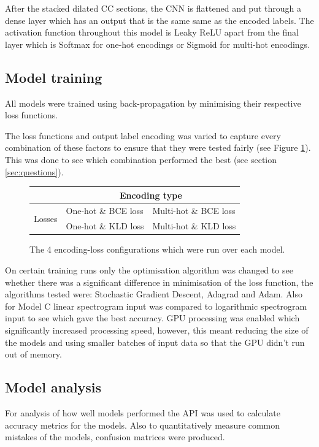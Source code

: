 \documentclass[12pt]{article}
\begin{document}
    After the stacked dilated CC sections, the CNN is flattened and put through a dense layer which has an output that is the same same as the encoded labels. The activation function throughout this model is Leaky ReLU apart from the final layer which is Softmax for one-hot encodings or Sigmoid for multi-hot encodings.\medskip
    
    \subsection{Model training}
    All models were trained using back-propagation by minimising their respective loss functions.\medskip
    
    The loss functions and output label encoding was varied to capture every combination of these factors to ensure that they were tested fairly (see Figure \ref{fig:test_table}). This was done to see which combination performed the best (see section \ref{sec:questions}).\medskip
    
    \begin{figure}[H]
        \centering
        \begin{tabular}{l|l|l|}
            & \multicolumn{2}{c|}{Encoding type} \\
            \hline
            \multirow{2}{*}{Losses}  & One-hot \& BCE loss & Multi-hot \& BCE loss\\
            \cline{2-3}
            & One-hot \& KLD loss & Multi-hot \& KLD loss\\
            \hline
        \end{tabular}
        \caption{The 4 encoding-loss configurations which were run over each model.}
        \label{fig:test_table}
    \end{figure}
    
    On certain training runs only the optimisation algorithm was changed to see whether there was a significant difference in minimisation of the loss function, the algorithms tested were: Stochastic Gradient Descent, Adagrad and Adam. Also for Model C linear spectrogram input was compared to logarithmic spectrogram input to see which gave the best accuracy. GPU processing was enabled which significantly increased processing speed, however, this meant reducing the size of the models and using smaller batches of input data so that the GPU didn't run out of memory.\medskip
    
    \subsection{Model analysis}
    For analysis of how well models performed the \textcite{Keras} API was used to calculate accuracy metrics for the models. Also to quantitatively measure common mistakes of the models, confusion matrices were produced.\medskip 
    
\end{document}
